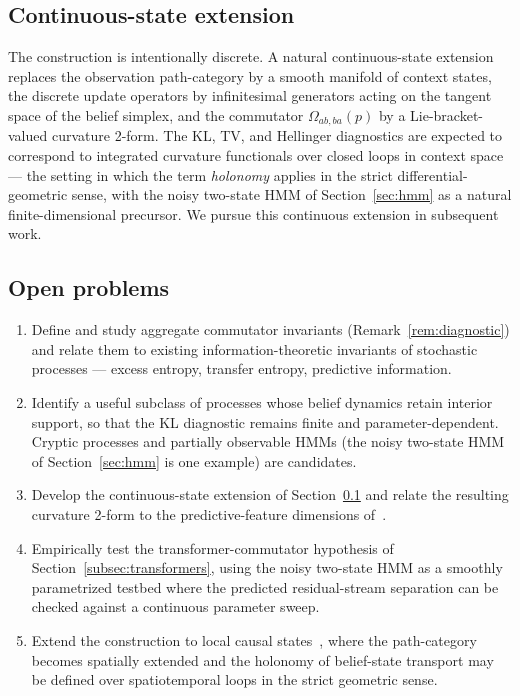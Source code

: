 \documentclass[11pt,a4paper]{article}
\theoremstyle{plain}
\theoremstyle{definition}
\theoremstyle{remark}
\begin{document}
\subsection{Continuous-state extension}
\label{subsec:continuous}

The construction is intentionally discrete. A natural continuous-state extension replaces the observation path-category by a smooth manifold of context states, the discrete update operators by infinitesimal generators acting on the tangent space of the belief simplex, and the commutator $\Omega_{ab,ba}(p)$ by a Lie-bracket-valued curvature 2-form. The KL, TV, and Hellinger diagnostics are expected to correspond to integrated curvature functionals over closed loops in context space --- the setting in which the term \emph{holonomy} applies in the strict differential-geometric sense, with the noisy two-state HMM of Section~\ref{sec:hmm} as a natural finite-dimensional precursor. We pursue this continuous extension in subsequent work.

\subsection{Open problems}

\begin{enumerate}[label=(\arabic*),itemsep=2pt,topsep=2pt]
    \item Define and study aggregate commutator invariants (Remark~\ref{rem:diagnostic}) and relate them to existing information-theoretic invariants of stochastic processes --- excess entropy, transfer entropy, predictive information.
    \item Identify a useful subclass of processes whose belief dynamics retain interior support, so that the KL diagnostic remains finite and parameter-dependent. Cryptic processes and partially observable HMMs (the noisy two-state HMM of Section~\ref{sec:hmm} is one example) are candidates.
    \item Develop the continuous-state extension of Section~\ref{subsec:continuous} and relate the resulting curvature 2-form to the predictive-feature dimensions of~\cite{marzen2017}.
    \item Empirically test the transformer-commutator hypothesis of Section~\ref{subsec:transformers}, using the noisy two-state HMM as a smoothly parametrized testbed where the predicted residual-stream separation can be checked against a continuous parameter sweep.
    \item Extend the construction to local causal states~\cite{rupe2018}, where the path-category becomes spatially extended and the holonomy of belief-state transport may be defined over spatiotemporal loops in the strict geometric sense.
\end{enumerate}
\end{document}
